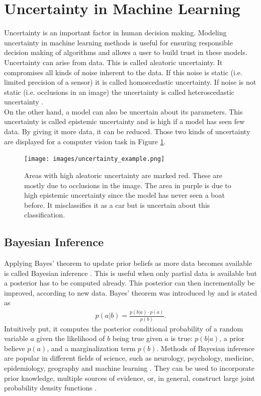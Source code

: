\documentclass[a4paper,cleardoubleempty,BCOR1cm, 11pt]{report}
\begin{document}
\section{Uncertainty in Machine Learning}
Uncertainty is an important factor in human decision making. Modeling uncertainty in machine learning methods is useful for ensuring responsible decision making of algorithms and allows a user to build trust in these models. Uncertainty can arise from data. This is called aleatoric uncertainty. It compromises all kinds of noise inherent to the data. If this noise is static (i.e. limited precision of a sensor) it is called homoscedastic uncertainty. If noise is not static (i.e. occlusions in an image) the uncertainty is called heteroscedastic uncertainty \cite{kwon2020uncertainty}.\\
On the other hand, a model can also be uncertain about its parameters. This uncertainty is called epistemic uncertainty and is high if a model has seen few data. By giving it more data, it can be reduced. Those two kinds of uncertainty are displayed for a computer vision task in Figure \ref{fig:uncertainty_example}.
\begin{figure}
	\centering
	\texttt{[image: images/uncertainty\_example.png]} 
	\caption{Areas with high aleatoric uncertainty are marked red. These are mostly due to occlusions in the image. The area in purple is due to high epistemic uncertainty since the model has never seen a boat before. It misclassifies it as a car but is uncertain about this classification.}
	\label{fig:uncertainty_example}
\end{figure}


\subsection{Bayesian Inference}
Applying Bayes' theorem to update prior beliefs as more data becomes available is called Bayesian inference \cite{box2011bayesian}. This is useful when only partial data is available but a posterior has to be computed already. This posterior can then incrementally be improved, according to new data.
 Bayes' theorem was introduced by \citet{bayes1763lii} and is stated as
\begin{align}\label{eq:bayestheorem}
	p(a|b) = \frac{p(b|a) \cdot p(a)}{p(b)}.
\end{align}
Intuitively put, it computes the posterior conditional probability of a random variable $a$ given the likelihood of $b$ being true given $a$ is true: $p(b|a)$, a prior believe $p(a)$, and a marginalization term $p(b)$. Methods of Bayesian inference are popular in different fields of science, such as neurology, psychology, medicine, epidemiology, geography and machine learning \cite{friston2002classical,wagenmakers2018bayesian,koch2006bayesian,parmigiani2002modeling,didelot2014bayesian,ghahramani2015probabilistic}. They can be used to incorporate prior knowledge, multiple sources of evidence, or, in general, construct large joint probability density functions \cite{Spiegelhalter:2009}.
\end{document}
